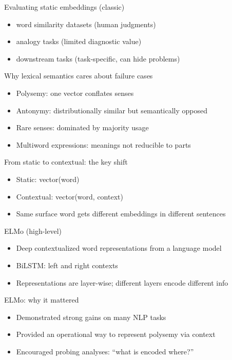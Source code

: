 \documentclass{beamer}
\begin{document}
\begin{frame}{Evaluating static embeddings (classic)}
\begin{itemize}
  \item word similarity datasets (human judgments)
  \item analogy tasks (limited diagnostic value)
  \item downstream tasks (task-specific, can hide problems)
\end{itemize}
\end{frame}

\begin{frame}{Why lexical semantics cares about failure cases}
\begin{itemize}
  \item Polysemy: one vector conflates senses
  \item Antonymy: distributionally similar but semantically opposed
  \item Rare senses: dominated by majority usage
  \item Multiword expressions: meanings not reducible to parts
\end{itemize}
\end{frame}

\begin{frame}{From static to contextual: the key shift}
\begin{itemize}
  \item Static: vector(word)
  \item Contextual: vector(word, context)
  \item Same surface word gets different embeddings in different sentences
\end{itemize}
\end{frame}

\begin{frame}{ELMo (high-level)}
\begin{itemize}
  \item Deep contextualized word representations from a language model
  \item BiLSTM: left and right contexts
  \item Representations are layer-wise; different layers encode different info
\end{itemize}
\end{frame}

\begin{frame}{ELMo: why it mattered}
\begin{itemize}
  \item Demonstrated strong gains on many NLP tasks
  \item Provided an operational way to represent polysemy via context
  \item Encouraged probing analyses: ``what is encoded where?''
\end{itemize}
\end{frame}
\end{document}
